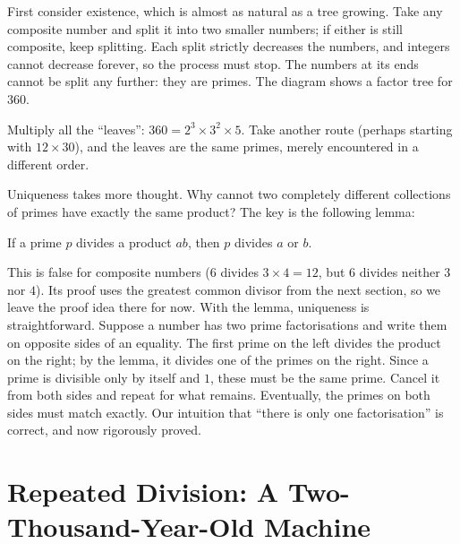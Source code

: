 First consider existence, which is almost as natural as a tree growing. Take any composite number and split it into two smaller numbers; if either is still composite, keep splitting. Each split strictly decreases the numbers, and integers cannot decrease forever, so the process must stop. The numbers at its ends cannot be split any further: they are primes. The diagram shows a factor tree for $360$.

\begin{center}
\end{center}

Multiply all the ``leaves'': $360=2^3\times 3^2\times 5$. Take another route (perhaps starting with $12\times 30$), and the leaves are the same primes, merely encountered in a different order.

Uniqueness takes more thought. Why cannot two completely different collections of primes have exactly the same product? The key is the following lemma:

\begin{tuilun}
If a prime $p$ divides a product $ab$, then $p$ divides $a$ or $b$.
\end{tuilun}

This is false for composite numbers ($6$ divides $3\times 4=12$, but $6$ divides neither $3$ nor $4$). Its proof uses the greatest common divisor from the next section, so we leave the proof idea there for now. With the lemma, uniqueness is straightforward. Suppose a number has two prime factorisations and write them on opposite sides of an equality. The first prime on the left divides the product on the right; by the lemma, it divides one of the primes on the right. Since a prime is divisible only by itself and $1$, these must be the same prime. Cancel it from both sides and repeat for what remains. Eventually, the primes on both sides must match exactly. Our intuition that ``there is only one factorisation'' is correct, and now rigorously proved.

\section{Repeated Division: A Two-Thousand-Year-Old Machine}


